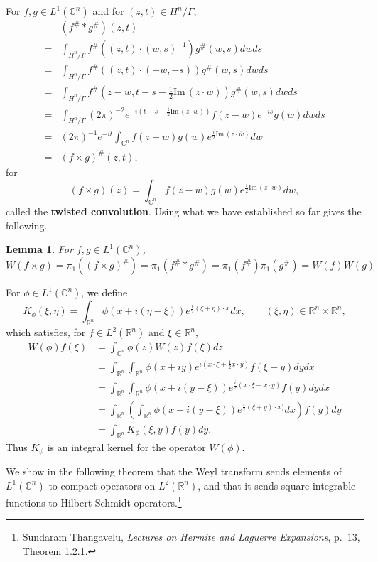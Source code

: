 \documentclass{article}
\def\Im{\ensuremath{\mathrm{Im}}\,}
\newtheorem{lemma}[theorem]{Lemma}
\theoremstyle{definition}
\begin{document}
For $f,g \in L^1(\mathbb{C}^n)$ and for $(z,t) \in H^n/\Gamma$,
\[
\begin{split}
&(f^{\#} * g^{\#})(z,t)\\
=&\int_{H^n/\Gamma} f^{\#}((z,t)\cdot (w,s)^{-1}) g^{\#}(w,s) dw ds\\
=&\int_{H^n/\Gamma} f^{\#}((z,t)\cdot (-w,-s ) ) g^{\#}(w,s) dw ds\\
=&\int_{H^n/\Gamma} f^{\#}\left(z-w,t-s-\frac{1}{2}\Im(z\cdot \overline{w}) \right)
g^{\#}(w,s) dw ds\\
=&\int_{H^n/\Gamma} (2\pi)^{-2} e^{-i\left(t-s-\frac{1}{2}\Im(z\cdot \overline{w})\right)} 
f(z-w) e^{-is} g(w) dw ds\\
=&(2\pi)^{-1} e^{-it} \int_{\mathbb{C}^n} f(z-w) g(w) e^{\frac{i}{2} \Im(z \cdot \overline{w})}
dw\\
=&(f \times g)^{\#}(z,t),
\end{split}
\]
for
\[
(f \times g)(z) =  \int_{\mathbb{C}^n} f(z-w) g(w) e^{\frac{i}{2} \Im(z \cdot \overline{w})}
dw,
\]
called  the \textbf{twisted convolution}. 
Using what we have established so far gives the following.

\begin{lemma}
For $f,g \in L^1(\mathbb{C}^n)$,
\[
W(f \times g)=\pi_1((f \times g)^{\#})=
\pi_1(f^{\#} * g^{\#})=
\pi_1(f^{\#}) \pi_1(g^{\#})
=W(f) W(g)
\]
\end{lemma}


For $\phi \in L^1(\mathbb{C}^n)$, we define
\[
K_\phi(\xi,\eta) = \int_{\mathbb{R}^n} \phi(x+i(\eta-\xi)) e^{\frac{i}{2}(\xi+\eta)\cdot x} dx,\qquad
(\xi,\eta) \in \mathbb{R}^n \times \mathbb{R}^n,
\]
which satisfies, for $f \in L^2(\mathbb{R}^n)$ and $\xi \in \mathbb{R}^n$,
\begin{align*}
W(\phi) f(\xi)&=\int_{\mathbb{C}^n} \phi(z) W(z) f(\xi) dz\\
&=\int_{\mathbb{R}^n} \int_{\mathbb{R}^n} \phi(x+iy) e^{i\left(x\cdot \xi + \frac{1}{2}x\cdot y\right)}  f(\xi+y) dy dx\\
&=\int_{\mathbb{R}^n} \int_{\mathbb{R}^n} \phi(x+i(y-\xi)) e^{\frac{i}{2}(x\cdot \xi +x\cdot y)} f(y) dy dx\\
&=\int_{\mathbb{R}^n} \left(\int_{\mathbb{R}^n} \phi(x+i(y-\xi)) e^{\frac{i}{2}(\xi+y)\cdot x)} dx \right) f(y) dy\\
&=\int_{\mathbb{R}^n} K_\phi(\xi,y)f(y) dy.
\end{align*}
Thus $K_\phi$ is an integral kernel for  the operator $W(\phi)$. 


We show in the following theorem that the Weyl transform sends elements of $L^1(\mathbb{C}^n)$ to  compact operators on
$L^2(\mathbb{R}^n)$, and that 
it sends square integrable functions to Hilbert-Schmidt operators.\footnote{Sundaram Thangavelu, {\em Lectures on Hermite and Laguerre Expansions},
p.~13, Theorem 1.2.1.}
\end{document}

